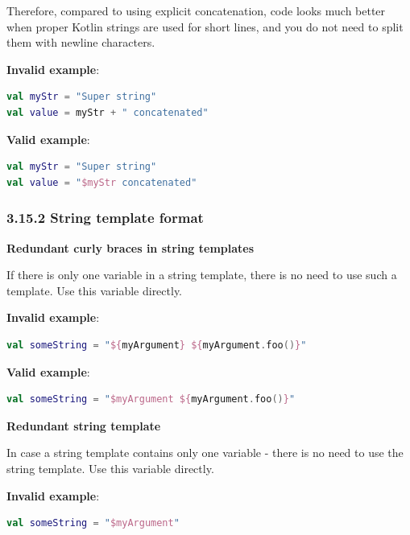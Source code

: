 {{{{Therefore, compared to using explicit concatenation, code looks much better when proper Kotlin strings are used for short lines, and you do not need to split them with newline characters.



\textbf{Invalid example}:

\begin{lstlisting}[language=Kotlin]
val myStr = "Super string"
val value = myStr + " concatenated"
\end{lstlisting}


\textbf{Valid example}:

\begin{lstlisting}[language=Kotlin]
val myStr = "Super string"
val value = "$myStr concatenated"
\end{lstlisting}


\subsubsection*{\textbf{3.15.2 String template format}}
\leavevmode\newline

\label{sec:3.15.2}

\textbf{Redundant curly braces in string templates}



If there is only one variable in a string template, there is no need to use such a template. Use this variable directly.

\textbf{Invalid example}:

\begin{lstlisting}[language=Kotlin]
val someString = "${myArgument} ${myArgument.foo()}"
\end{lstlisting}


\textbf{Valid example}:

\begin{lstlisting}[language=Kotlin]
val someString = "$myArgument ${myArgument.foo()}"
\end{lstlisting}


\textbf{Redundant string template}



In case a string template contains only one variable - there is no need to use the string template. Use this variable directly.



\textbf{Invalid example}:

\begin{lstlisting}[language=Kotlin]
val someString = "$myArgument"
\end{lstlisting}


}}}}
